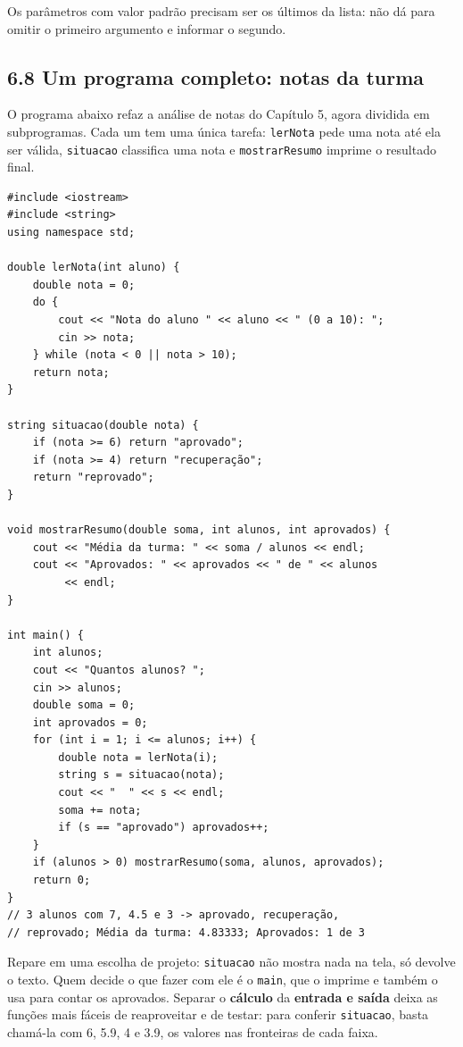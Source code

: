 Os parâmetros com valor padrão precisam ser os últimos da lista: não dá para omitir o primeiro argumento e informar o segundo.

\subsection{6.8 Um programa completo: notas da turma}

O programa abaixo refaz a análise de notas do Capítulo 5, agora dividida em subprogramas. Cada um tem uma única tarefa: \texttt{lerNota} pede uma nota até ela ser válida, \texttt{situacao} classifica uma nota e \texttt{mostrarResumo} imprime o resultado final.

\begin{codigo}
\begin{Verbatim}[breaklines=true, breaksymbolleft={}, fontsize=\footnotesize]
#include <iostream>
#include <string>
using namespace std;

double lerNota(int aluno) {
    double nota = 0;
    do {
        cout << "Nota do aluno " << aluno << " (0 a 10): ";
        cin >> nota;
    } while (nota < 0 || nota > 10);
    return nota;
}

string situacao(double nota) {
    if (nota >= 6) return "aprovado";
    if (nota >= 4) return "recuperação";
    return "reprovado";
}

void mostrarResumo(double soma, int alunos, int aprovados) {
    cout << "Média da turma: " << soma / alunos << endl;
    cout << "Aprovados: " << aprovados << " de " << alunos
         << endl;
}

int main() {
    int alunos;
    cout << "Quantos alunos? ";
    cin >> alunos;
    double soma = 0;
    int aprovados = 0;
    for (int i = 1; i <= alunos; i++) {
        double nota = lerNota(i);
        string s = situacao(nota);
        cout << "  " << s << endl;
        soma += nota;
        if (s == "aprovado") aprovados++;
    }
    if (alunos > 0) mostrarResumo(soma, alunos, aprovados);
    return 0;
}
// 3 alunos com 7, 4.5 e 3 -> aprovado, recuperação,
// reprovado; Média da turma: 4.83333; Aprovados: 1 de 3
\end{Verbatim}
\end{codigo}

Repare em uma escolha de projeto: \texttt{situacao} não mostra nada na tela, só devolve o texto. Quem decide o que fazer com ele é o \texttt{main}, que o imprime e também o usa para contar os aprovados. Separar o \textbf{cálculo} da \textbf{entrada e saída} deixa as funções mais fáceis de reaproveitar e de testar: para conferir \texttt{situacao}, basta chamá-la com 6, 5.9, 4 e 3.9, os valores nas fronteiras de cada faixa.

